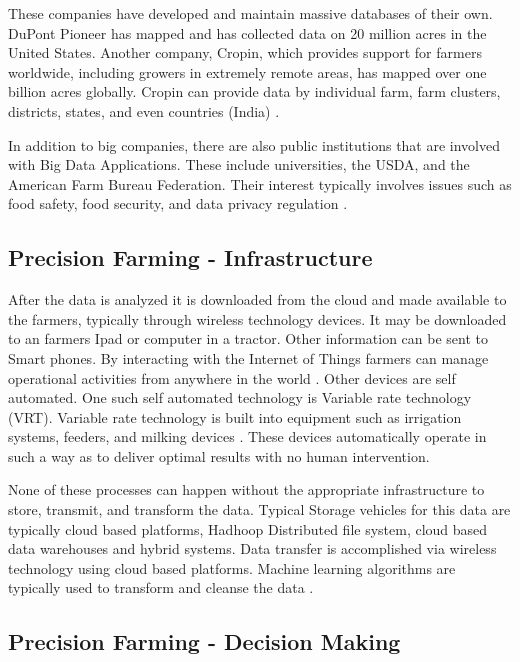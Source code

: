 \documentclass[sigconf]{acmart}
\begin{document}
These companies have developed and maintain massive databases of their own.  DuPont Pioneer has mapped and has collected data on 20 million acres in the United States. Another company, Cropin, which provides support for farmers worldwide, including growers in extremely remote areas, has mapped over one billion acres globally. Cropin can provide data by individual farm, farm clusters, districts, states, and even countries (India) \cite {www-google-Crop}.

In addition to big companies, there are also public institutions that are involved with Big Data Applications. These include universities, the USDA, and the American Farm Bureau Federation.  Their interest typically involves issues such as food safety, food security, and data privacy regulation \cite{Wolfert}. 

\subsection{Precision Farming - Infrastructure}

After the data is analyzed it is downloaded from the cloud and made available to the farmers, typically through wireless technology devices. It may be downloaded to an farmers Ipad or computer in a tractor.  Other information can be sent to Smart phones. By interacting with the Internet of Things farmers can manage operational activities from anywhere in the world \cite{Wolfert}.  Other devices are self automated. One such self automated technology is Variable rate technology (VRT). Variable rate technology is built into equipment such as irrigation systems, feeders, and milking devices \cite{www-google-Wikipedia}. These devices automatically operate in such a way as to deliver optimal results with no human intervention. 

None of these processes can happen without the appropriate infrastructure to store, transmit, and transform the data. Typical Storage vehicles for this data are typically cloud based platforms, Hadhoop Distributed file system, cloud based data warehouses and hybrid systems.  Data transfer is accomplished via wireless technology using cloud based platforms. Machine learning algorithms are typically used to transform and cleanse the data \cite{Wolfert}.

\subsection {Precision Farming - Decision Making}
\end{document}
